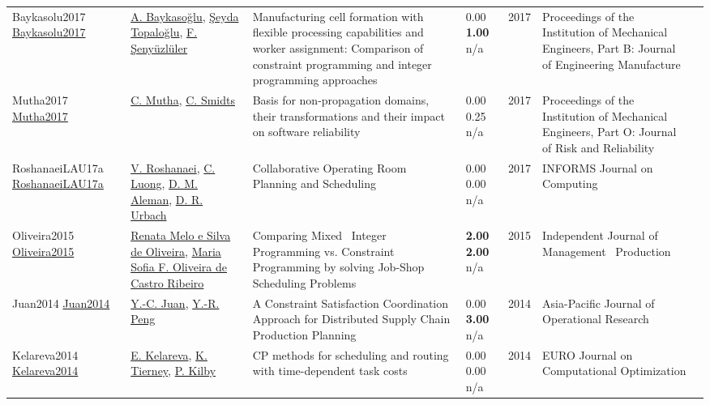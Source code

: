 {\begin{longtable}{p{3cm}p{5cm}p{10cm}p{1cm}rp{2.5cm}l}
Baykasolu2017 \href{https://doi.org/10.1177/0954405416682281}{Baykasolu2017} & \hyperref[auth:a2206]{A. Baykasoğlu}, \hyperref[auth:a2207]{Şeyda Topaloğlu}, \hyperref[auth:a2208]{F. Şenyüzlüler} & Manufacturing cell formation with flexible processing capabilities and worker assignment: Comparison of constraint programming and integer programming approaches & \noindent{}\textcolor{black!50}{0.00} \textbf{1.00} n/a & 2017 & Proceedings of the Institution of Mechanical Engineers, Part B: Journal of Engineering Manufacture & \cite{Baykasolu2017}\\
Mutha2017 \href{http://dx.doi.org/10.1177/1748006x17744380}{Mutha2017} & \hyperref[auth:a1954]{C. Mutha}, \hyperref[auth:a1955]{C. Smidts} & Basis for non-propagation domains, their transformations and their impact on software reliability & \noindent{}\textcolor{black!50}{0.00} 0.25 n/a & 2017 & Proceedings of the Institution of Mechanical Engineers, Part O: Journal of Risk and Reliability & \cite{Mutha2017}\\
RoshanaeiLAU17a \href{http://dx.doi.org/10.1287/ijoc.2017.0745}{RoshanaeiLAU17a} & \hyperref[auth:a727]{V. Roshanaei}, \hyperref[auth:a926]{C. Luong}, \hyperref[auth:a894]{D. M. Aleman}, \hyperref[auth:a895]{D. R. Urbach} & Collaborative Operating Room Planning and Scheduling & \noindent{}\textcolor{black!50}{0.00} \textcolor{black!50}{0.00} n/a & 2017 & \cellcolor{red!20}INFORMS Journal on Computing & \cite{RoshanaeiLAU17a}\\
Oliveira2015 \href{http://dx.doi.org/10.14807/ijmp.v6i1.262}{Oliveira2015} & \hyperref[auth:a1566]{Renata Melo e Silva de Oliveira}, \hyperref[auth:a1567]{Maria Sofia F. Oliveira de Castro Ribeiro} & Comparing Mixed \  Integer Programming vs. Constraint Programming by solving Job-Shop Scheduling Problems & \noindent{}\textbf{2.00} \textbf{2.00} n/a & 2015 & Independent Journal of Management \  Production & \cite{Oliveira2015}\\
Juan2014 \href{http://dx.doi.org/10.1142/s0217595914500419}{Juan2014} & \hyperref[auth:a1978]{Y.-C. Juan}, \hyperref[auth:a1979]{Y.-R. Peng} & A Constraint Satisfaction Coordination Approach for Distributed Supply Chain Production Planning & \noindent{}\textcolor{black!50}{0.00} \textbf{3.00} n/a & 2014 & Asia-Pacific Journal of Operational Research & \cite{Juan2014}\\
Kelareva2014 \href{http://dx.doi.org/10.1007/s13675-014-0022-7}{Kelareva2014} & \hyperref[auth:a332]{E. Kelareva}, \hyperref[auth:a333]{K. Tierney}, \hyperref[auth:a334]{P. Kilby} & \cellcolor{gold!20}CP methods for scheduling and routing with time-dependent task costs & \noindent{}\textcolor{black!50}{0.00} \textcolor{black!50}{0.00} n/a & 2014 & EURO Journal on Computational Optimization & \cite{Kelareva2014}\\

\end{longtable}}
